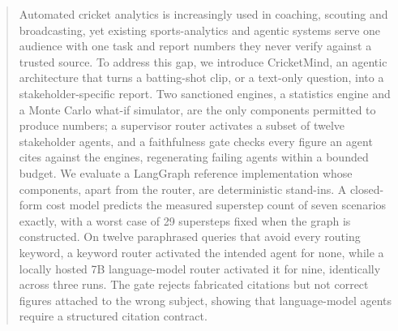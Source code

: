 \begin{abstract}
Automated cricket analytics is increasingly used in coaching, scouting and broadcasting, yet existing sports-analytics and agentic systems serve one audience with one task and report numbers they never verify against a trusted source. To address this gap, we introduce CricketMind, an agentic architecture that turns a batting-shot clip, or a text-only question, into a stakeholder-specific report. Two sanctioned engines, a statistics engine and a Monte Carlo what-if simulator, are the only components permitted to produce numbers; a supervisor router activates a subset of twelve stakeholder agents, and a faithfulness gate checks every figure an agent cites against the engines, regenerating failing agents within a bounded budget. We evaluate a LangGraph reference implementation whose components, apart from the router, are deterministic stand-ins. A closed-form cost model predicts the measured superstep count of seven scenarios exactly, with a worst case of 29 supersteps fixed when the graph is constructed. On twelve paraphrased queries that avoid every routing keyword, a keyword router activated the intended agent for none, while a locally hosted 7B language-model router activated it for nine, identically across three runs. The gate rejects fabricated citations but not correct figures attached to the wrong subject, showing that language-model agents require a structured citation contract.
\end{abstract}
